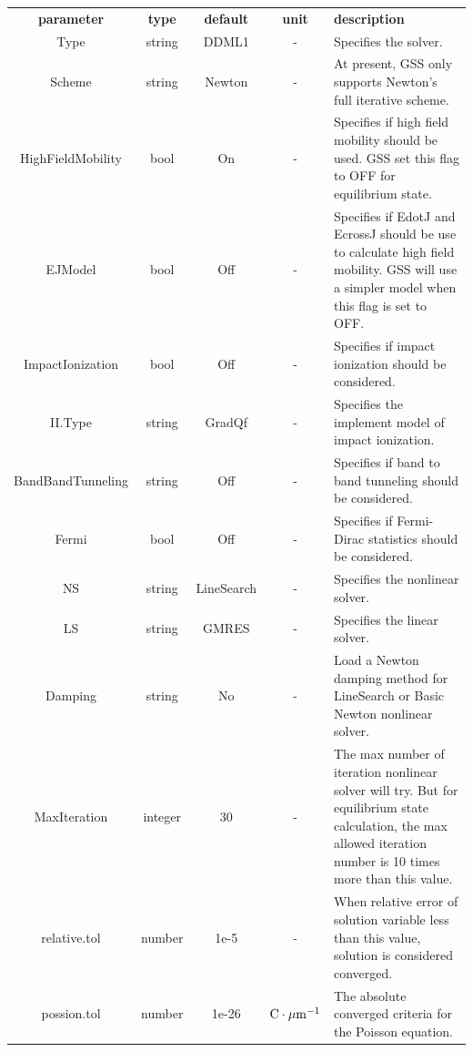 \documentclass[11pt,pdftex]{article}
\begin{document}
\small \noindent\begin{longtable}{ccccp{7cm}}
\textbf{parameter}   & \textbf{type}    & \textbf{default} & \textbf{unit} & \textbf{description} \\
Type              & string  & DDML1       & -    & Specifies the solver.\\
Scheme            & string  & Newton      & -    & At present, GSS only supports Newton's full iterative scheme.\\
HighFieldMobility & bool    & On          & -    & Specifies if high field mobility should be used. GSS set this flag to OFF for equilibrium state.\\
EJModel           & bool    & Off         & -    & Specifies if EdotJ and EcrossJ should be use to calculate high field mobility.
                                                   GSS will use a simpler model when this flag is set to OFF.\\
ImpactIonization  & bool    & Off         & -    & Specifies if impact ionization should be considered.\\
II.Type           & string  & GradQf      & -    & Specifies the implement model of impact ionization. \\
BandBandTunneling & string  & Off         & -    & Specifies if band to band tunneling should be considered.\\
Fermi             & bool    & Off         & -    & Specifies if Fermi-Dirac statistics should be considered.\\
NS                & string  &LineSearch   & -    & Specifies the nonlinear solver. \\
LS                & string  &GMRES        & -    & Specifies the linear solver. \\
Damping           & string  & No          & -    & Load a Newton damping method for LineSearch or Basic Newton nonlinear solver.\\
MaxIteration      & integer & 30          & -    & The max number of iteration nonlinear solver will try. But for equilibrium state calculation, the max
                                                    allowed iteration number is 10 times more than this value.\\
relative.tol      & number  & 1e-5        & -    & When relative error of solution variable less than this value, solution is considered converged.\\
possion.tol       & number  & 1e-26       &$\rm{C\cdot {\mu m}^{-1}} $ & The absolute converged criteria for the Poisson equation.\\

\end{longtable}
\end{document}
